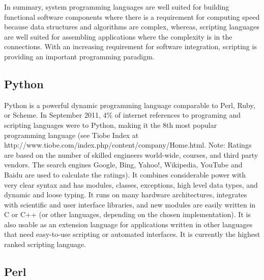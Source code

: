 \documentclass[10pt]{article}
\begin{document}
In summary, system programming languages are well suited for building functional software
components where there is a requirement for computing speed because data structures and
algorithms are complex, whereas, scripting languages are well suited for assembling
applications where the complexity is in the connections. With an
increasing requirement for software integration, scripting is
providing an important programming paradigm.





\subsection*{Python}

Python is a powerful dynamic programming language comparable to Perl,
Ruby, or Scheme. In September 2011, 4\% of internet references to programing and scripting languages were to Python, making it the 8th most popular programming
language (see Tiobe Index at http://www.tiobe.com/index.php/content/company/Home.html. Note: Ratings are based on the number of skilled engineers world-wide, courses, and third party vendors. The search engines Google, Bing, Yahoo!, Wikipedia, YouTube and Baidu are used to calculate the ratings).  It combines
considerable power with very clear syntax and has modules, classes,
exceptions, high level data types, and dynamic and loose typing. It
runs on many hardware architectures, integrates with scientific and
user interface libraries, and new modules are easily written in C or
C++ (or other languages, depending on the chosen implementation). It
is also usable as an extension language for applications written in
other languages that need easy-to-use scripting or automated
interfaces.  It is currently the highest ranked scripting language.


\subsection*{Perl}
\end{document}
